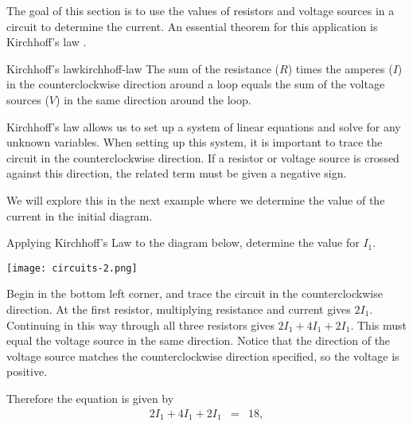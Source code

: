 \documentclass{ximera}
\begin{document}
\begin{exploration}
The goal of this section is to use the values of resistors and voltage
sources in a circuit to determine the current. An essential theorem
for this application is Kirchhoff's law%
.

\begin{theorem}{Kirchhoff's law}{kirchhoff-law}
  The sum of the resistance ($R$) times the amperes ($I$) in the
  counterclockwise direction around a loop equals the sum of the
  voltage sources ($V$) in the same direction around the loop.
\end{theorem}

Kirchhoff's law allows us to set up a system of linear equations and
solve for any unknown variables. When setting up this system, it is
important to trace the circuit in the counterclockwise direction. If a
resistor or voltage source is crossed against this direction, the
related term must be given a negative sign.

We will explore this in the next example where we determine the value
of the current in the initial diagram.

\begin{example}
  Applying Kirchhoff's Law to the diagram below, determine the value for $I_1$.

  \begin{center}
    \texttt{[image: circuits-2.png]}
  \end{center}



\begin{solution}
  Begin in the bottom left corner, and trace the circuit in the
  counterclockwise direction. At the first resistor, multiplying
  resistance and current gives $2I_1$. Continuing in this way through
  all three resistors gives $2I_1 + 4I_1 + 2 I_1$. This must equal the
  voltage source in the same direction. Notice that the direction of
  the voltage source matches the counterclockwise direction specified,
  so the voltage is positive.

  Therefore the equation is given by
  \begin{eqnarray*}
    2I_1 + 4I_1 + 2 I_1 &=& 18, \\
  \end{eqnarray*}


\end{solution}
\end{example}
\end{exploration}
\end{document}
